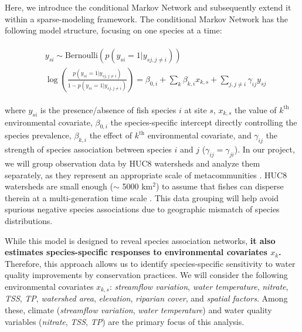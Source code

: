 \documentclass[12pt, class=article, crop=false]{standalone}
\begin{document}
Here, we introduce the conditional Markov Network and subsequently extend it within a sparse-modeling framework.
The conditional Markov Network has the following model structure, focusing on one species at a time:

\begin{align}\label{eq:markovnet}
\begin{split}
&y_{si} \sim \mbox{Bernoulli}(p(y_{si}=1|y_{sj, j \ne i}))\\
&\log\left(\frac{p(y_{si}=1|y_{sj, j \ne i})}{1 - p(y_{si}=1|y_{sj, j \ne i})}\right) = \beta_{0,i} + \sum_k \beta_{k,i}x_{k,s} + \sum_{j, j \ne i} \gamma_{ij} y_{sj}
\end{split}
\end{align}

where $y_{si}$ is the presence/absence of fish species $i$ at site $s$, $x_{k,s}$ the value of $k^{\text{th}}$ environmental covariate, $\beta_{0,i}$ the species-specific intercept directly controlling the species prevalence, $\beta_{k,i}$ the effect of $k^{\text{th}}$ environmental covariate, and $\gamma_{ij}$ the strength of species association between species $i$ and $j$ ($\gamma_{ij} = \gamma_{ji}$).
In our project, we will group observation data by HUC8 watersheds and analyze them separately, as they represent an appropriate scale of metacommunities \citep{giam_environment_2016}.
HUC8 watersheds are small enough ($\sim$ 5000 km$^2$) to assume that fishes can disperse therein at a multi-generation time scale \citep{comte_fish_2018}.
This data grouping will help avoid spurious negative species associations due to geographic mismatch of species distributions.

While this model is designed to reveal species association networks, \textbf{it also estimates species-specific responses to environmental covariates $x_k$.}
Therefore, this approach allows us to identify species-specific sensitivity to water quality improvements by conservation practices.
We will consider the following environmental covariates $x_{k,s}$: \textit{streamflow variation}, \textit{water temperature}, \textit{nitrate}, \textit{TSS}, \textit{TP}, \textit{watershed area}, \textit{elevation}, \textit{riparian cover}, and \textit{spatial factors}.
Among these, climate (\textit{streamflow variation}, \textit{water temperature}) and water quality variables (\textit{nitrate}, \textit{TSS}, \textit{TP}) are the primary focus of this analysis.
\end{document}

